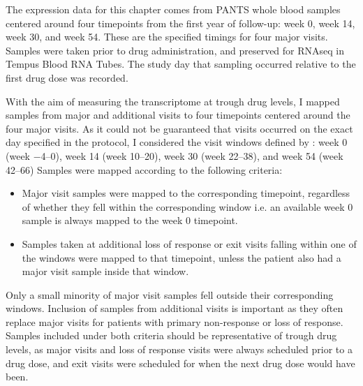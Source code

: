 \begin{outline}
%
The expression data for this chapter comes from \gls{PANTS} whole blood samples centered around four timepoints from the first year of follow-up: week 0, week 14, week 30, and week 54.
These are the specified timings for four major visits.
Samples were taken prior to drug administration, and preserved for \gls{RNAseq} in Tempus Blood RNA Tubes.
The study day that sampling occurred relative to the first drug dose was recorded.

With the aim of measuring the transcriptome at trough drug levels, I mapped samples from major and additional visits to four timepoints centered around the four major visits.
As it could not be guaranteed that visits occurred on the exact day specified in the protocol, I considered the visit windows defined by \textcite{kennedy2019PredictorsAntiTNFTreatment}: week 0 (week \numrange{-4}{0}), week 14 (week \numrange{10}{20}), week 30 (week \numrange{22}{38}), and week 54 (week \numrange{42}{66})
Samples were mapped according to the following criteria:
\begin{itemize}
\item Major visit samples were mapped to the corresponding timepoint, regardless of whether they fell within the corresponding window i.e. an available week 0 sample is always mapped to the week 0 timepoint.
\item Samples taken at additional loss of response or exit visits falling within one of the windows were mapped to that timepoint, unless the patient also had a major visit sample inside that window.
\end{itemize}
Only a small minority of major visit samples fell outside their corresponding windows.
Inclusion of samples from additional visits is important as they often replace major visits for patients with primary non-response or loss of response.
Samples included under both criteria should be representative of trough drug levels,
as major visits and loss of response visits were always scheduled prior to a drug dose,
and exit visits were scheduled for when the next drug dose would have been.


\end{outline}

